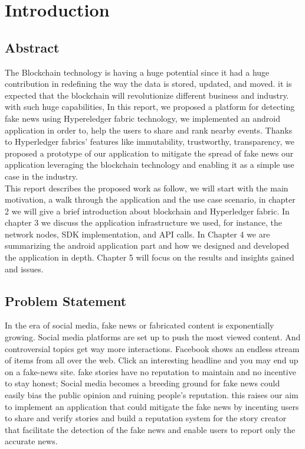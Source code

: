 \chapter{Introduction}
	 
\section{Abstract}

The Blockchain technology is having a huge potential since it had a huge contribution in redefining the way the data is stored, updated, and moved.
it is expected that the blockchain will revolutionize different business and industry. with such huge capabilities,
In this report, we proposed a platform for detecting fake news using Hypereledger fabric technology, we implemented an android application in order to, help the users to share and rank nearby events. Thanks to Hyperledger fabrics' features like immutability, trustworthy, transparency, we proposed a prototype of our application to mitigate the spread of fake news our application leveraging the blockchain technology and enabling it as a simple use case in the industry.\\

This report describes the proposed work as follow, we will start with the main motivation, a walk through the application and the use case scenario, in chapter 2 we will give a brief introduction about blockchain and Hyperledger fabric. In chapter 3 we discuss the application infrastructure we used, for instance, the network nodes, SDK implementation, and API calls. In Chapter 4 we are summarizing the android application part and how we designed and developed the application in depth. Chapter 5 will focus on the results and insights gained and issues. 



\section{Problem Statement}

In the era of social media, fake news or fabricated content is exponentially growing. Social media platforms are set up to push the most viewed content. And controversial topics get way more interactions. Facebook shows an endless stream of items from all over the web. Click an interesting headline and you may end up on a fake-news site. fake stories have no reputation to maintain and no incentive to stay honest; Social media becomes a breeding ground for fake news could easily bias the public opinion and ruining people's reputation. this raises our aim to implement an application that could mitigate the fake news by incenting users to share and verify stories and build a reputation system for the story creator that facilitate the detection of the fake news and enable users to report only the accurate news.


